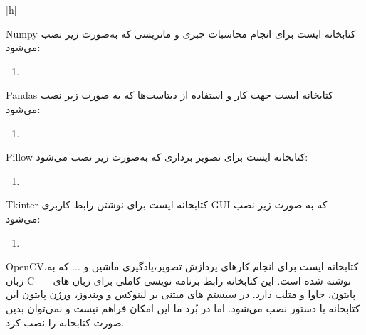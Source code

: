 [h]


Numpy کتابخانه ایست برای انجام محاسبات جبری و ماتریسی که به‌صورت زیر نصب می‌شود: 

\begin{latin}
	\begin{enumerate}
		\item {}
	\end{enumerate}
\end{latin}

Pandas کتابخانه ایست جهت کار و استفاده از دیتاست‌ها که به صورت زیر نصب می‌شود:

\begin{latin}
	\begin{enumerate}
		\item {}
	\end{enumerate}
\end{latin}


Pillow کتابخانه ایست برای تصویر برداری که به‌صورت زیر نصب می‌شود:

\begin{latin}
	\begin{enumerate}
		\item {}
	\end{enumerate}
\end{latin}

Tkinter کتابخانه ایست برای نوشتن رابط کاربری GUI که به صورت زیر نصب می‌شود: 

\begin{latin}
	\begin{enumerate}
		\item {}
	\end{enumerate}
\end{latin}


OpenCV،‌کتابخانه ایست برای انجام کارهای پردازش تصویر،‌یادگیری ماشین و ... که به زبان C++ نوشته شده است. این کتابخانه رابط برنامه نویسی کاملی برای زبان های پایتون، جاوا و متلب دارد. در سیستم های مبتنی بر لینوکس و ویندوز، ورژن پایتون این کتابخانه با دستور  نصب می‌شود. اما در بُرد ما این امکان فراهم نیست و نمی‌توان بدین صورت کتابخانه را نصب کرد.

